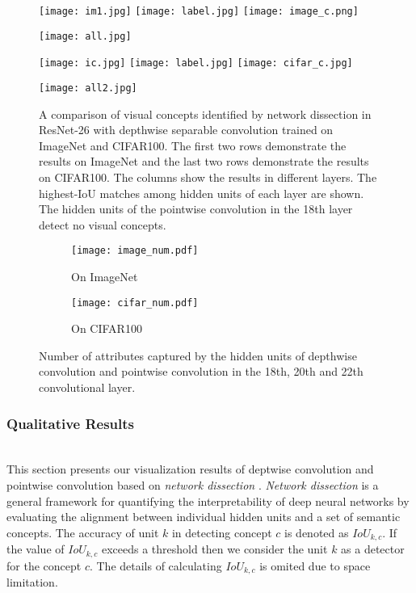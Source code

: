 \documentclass[letterpaper]{article} \usepackage{aaai19}  \usepackage{times}  \usepackage{helvet}  \usepackage{courier}  \usepackage{url}  \usepackage{graphicx}  \usepackage{amssymb}
\begin{document}
 \begin{figure*}[ht]
\centering
\texttt{[image: im1.jpg]} 
\texttt{[image: label.jpg]} 
\texttt{[image: image\_c.png]} 

\texttt{[image: all.jpg]} 


\texttt{[image: ic.jpg]} 
\texttt{[image: label.jpg]} 
\texttt{[image: cifar\_c.jpg]} 

\texttt{[image: all2.jpg]} 

\caption{A comparison of visual concepts identified by network dissection in ResNet-26 with depthwise separable convolution trained on ImageNet and CIFAR100. The first two rows demonstrate the results on ImageNet and the last two rows demonstrate the results on CIFAR100. The columns show the results in different layers. The highest-IoU matches among hidden units of each layer are shown. The hidden units of the pointwise convolution in the 18th layer detect no visual concepts. }
\label{fig:concepts}
\end{figure*}

\begin{figure}[h]
\centering
   \begin{subfigure}{0.49\linewidth} \centering
     \texttt{[image: image\_num.pdf]}
     \caption{On ImageNet}
   \end{subfigure}
   \begin{subfigure}{0.49\linewidth} \centering
     \texttt{[image: cifar\_num.pdf]}
     \caption{On CIFAR100}
   \end{subfigure}
\caption{Number of attributes captured by the hidden units of depthwise convolution and pointwise convolution in the 18th, 20th and 22th convolutional layer.}   \label{fig: concepts_num}
\end{figure}

\subsubsection{Qualitative Results} ~\\
This section presents our visualization results of deptwise convolution and pointwise convolution based on \textit{network dissection} \cite{bau2017network}. \textit{Network dissection} is a general framework for quantifying the interpretability of deep neural networks by evaluating the alignment between individual hidden units and a set of semantic concepts. The accuracy of unit $k$
in detecting concept $c$ is denoted as $IoU_{k,c}$. If the value of $IoU_{k,c}$ exceeds a threshold then we consider the unit $k$ as a detector for the concept $c$. The details of calculating $IoU_{k,c}$ is omited due to space limitation. 
\end{document}
